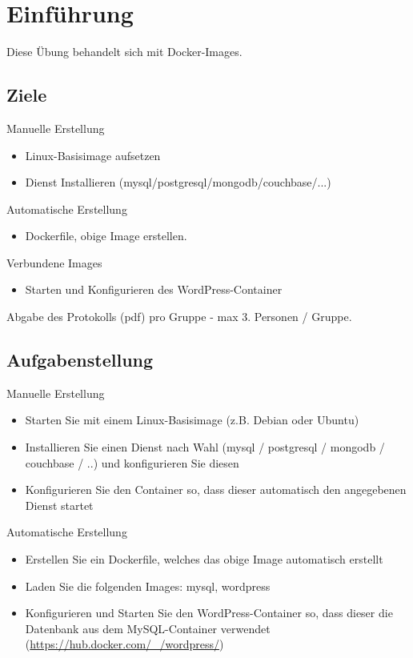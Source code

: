 
\section{Einführung}
Diese Übung behandelt sich mit Docker-Images.
\subsection{Ziele}
Manuelle Erstellung
\begin{itemize}
	\item Linux-Basisimage aufsetzen
	\item Dienst Installieren (mysql/postgresql/mongodb/couchbase/...)
\end{itemize}
Automatische Erstellung
\begin{itemize}
	\item Dockerfile, obige Image erstellen.
\end{itemize}
Verbundene Images
\begin{itemize}
	\item Starten und Konfigurieren des WordPress-Container
\end{itemize}

Abgabe des Protokolls (pdf) pro Gruppe - max 3. Personen / Gruppe.


\subsection{Aufgabenstellung}
Manuelle Erstellung
\begin{itemize}
	\item Starten Sie mit einem Linux-Basisimage (z.B. Debian oder Ubuntu)
	\item Installieren Sie einen Dienst nach Wahl (mysql / postgresql / mongodb / couchbase / ..) und konfigurieren Sie diesen
	\item Konfigurieren Sie den Container so, dass dieser automatisch den angegebenen Dienst startet
\end{itemize}

Automatische Erstellung
\begin{itemize}
	\item Erstellen Sie ein Dockerfile, welches das obige Image automatisch erstellt
\end{itemize}

\begin{itemize}
	\item Laden Sie die folgenden Images: mysql, wordpress
	\item Konfigurieren und Starten Sie den WordPress-Container so, dass dieser die Datenbank aus dem MySQL-Container verwendet (\url{https://hub.docker.com/_/wordpress/})
\end{itemize}
\clearpage